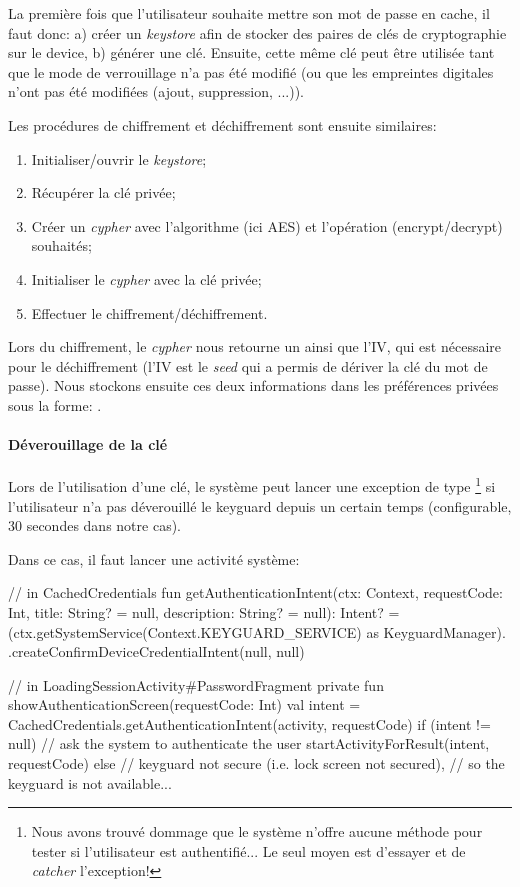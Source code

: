 La première fois que l'utilisateur souhaite mettre son mot de passe en cache, il faut donc: a)  créer un \emph{keystore} afin de stocker des paires de clés de cryptographie sur le device, b) générer une clé. Ensuite, cette même clé peut être utilisée tant que le mode de verrouillage n'a pas été modifié (ou que les empreintes digitales n'ont pas été modifiées (ajout, suppression, ...)).

Les procédures de chiffrement et déchiffrement sont ensuite similaires:

\begin{enumerate}
    \item Initialiser/ouvrir le \emph{keystore};
    \item Récupérer la clé privée;
    \item Créer un \emph{cypher} avec l'algorithme (ici AES) et l'opération (encrypt/decrypt) souhaités;
    \item Initialiser le \emph{cypher} avec la clé privée;
    \item Effectuer le chiffrement/déchiffrement.
\end{enumerate}

Lors du chiffrement, le \emph{cypher} nous retourne un  ainsi que l'IV, qui est nécessaire pour le déchiffrement (l'IV est le \emph{seed} qui a permis de dériver la clé du mot de passe). Nous stockons ensuite ces deux informations dans les préférences privées sous la forme: .

\paragraph*{Déverouillage de la clé} Lors de l'utilisation d'une clé, le système peut lancer une exception de type \footnote{Nous avons trouvé dommage que le système n'offre aucune méthode pour tester si l'utilisateur est authentifié... Le seul moyen est d'essayer et de \emph{catcher} l'exception!} si l'utilisateur n'a pas déverouillé le keyguard depuis un certain temps (configurable, 30 secondes dans notre cas). 

Dans ce cas, il faut lancer une activité système:

\begin{kotlincode}
// in CachedCredentials
fun getAuthenticationIntent(ctx: Context, requestCode: Int, 
    title: String? = null, description: String? = null): Intent? =
    (ctx.getSystemService(Context.KEYGUARD_SERVICE) as KeyguardManager).
        .createConfirmDeviceCredentialIntent(null, null)


// in LoadingSessionActivity#PasswordFragment
private fun showAuthenticationScreen(requestCode: Int) {
    val intent = CachedCredentials.getAuthenticationIntent(activity, requestCode)
    if (intent != null) {
        // ask the system to authenticate the user
        startActivityForResult(intent, requestCode)
    } else {
        // keyguard not secure (i.e. lock screen not secured),
        // so the keyguard is not available...
    }
}
\end{kotlincode}

